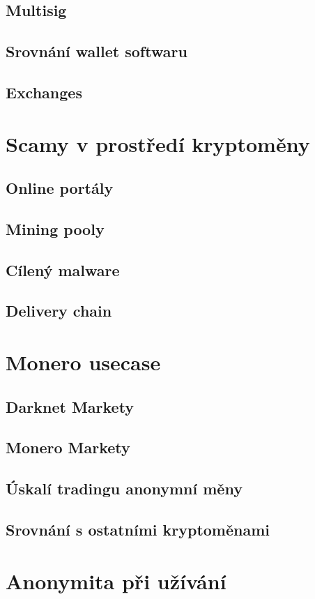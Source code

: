 \documentclass[
  printed, %
  table,   %
  nolof,     %
  nolot,     %
           oneside, color
]{fithesis3}
\begin{document}
\subsection{Multisig}
\subsection{Srovnání wallet softwaru}
\subsection{Exchanges}
\section{Scamy v prostředí kryptoměny}
\subsection{Online portály}
\subsection{Mining pooly}
\subsection{Cílený malware}
\subsection{Delivery chain}

\section{Monero usecase}
\subsection{Darknet Markety}
\subsection{Monero Markety}
\subsection{Úskalí tradingu anonymní měny}
\subsection{Srovnání s ostatními kryptoměnami}

\section{Anonymita při užívání}
\end{document}
